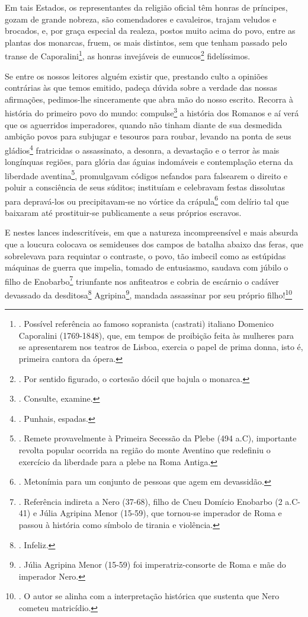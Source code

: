 Em tais Estados, os representantes da religião oficial têm honras de
príncipes, gozam de grande nobreza, são comendadores e cavaleiros,
trajam veludos e brocados, e, por graça especial da realeza, postos
muito acima do povo, entre as plantas dos monarcas, fruem, os mais
distintos, sem que tenham passado pelo transe de Caporalini\footnote{.
  Possível referência ao famoso sopranista (castrati) italiano Domenico
  Caporalini (1769-1848), que, em tempos de proibição feita às mulheres
  para se apresentarem nos teatros de Lisboa, exercia o papel de prima
  donna, isto é, primeira cantora da ópera.}, as honras invejáveis de
eunucos\footnote{. Por sentido figurado, o cortesão dócil que bajula o
  monarca.} fidelíssimos.

Se entre os nossos leitores alguém existir que, prestando culto a
opiniões contrárias às que temos emitido, padeça dúvida sobre a verdade
das nossas afirmações, pedimos-lhe sinceramente que abra mão do nosso
escrito. Recorra à história do primeiro povo do mundo:
compulse\footnote{. Consulte, examine.} a história dos Romanos e aí verá
que os aguerridos imperadores, quando não tinham diante de sua desmedida
ambição povos para subjugar e tesouros para roubar, levando na ponta de
seus gládios\footnote{. Punhais, espadas.} fratricidas o assassinato, a
desonra, a devastação e o terror às mais longínquas regiões, para glória
das águias indomáveis e contemplação eterna da liberdade
aventina\footnote{. Remete provavelmente à Primeira Secessão da Plebe
  (494 a.C), importante revolta popular ocorrida na região do monte
  Aventino que redefiniu o exercício da liberdade para a plebe na Roma
  Antiga.}, promulgavam códigos nefandos para falsearem o direito e
poluir a consciência de seus súditos; instituíam e celebravam festas
dissolutas para depravá-los ou precipitavam-se no vórtice da
crápula\footnote{. Metonímia para um conjunto de pessoas que agem em
  devassidão.} com delírio tal que baixaram até prostituir-se
publicamente a seus próprios escravos.

E nestes lances indescritíveis, em que a natureza incompreensível e mais
absurda que a loucura colocava os semideuses dos campos de batalha
abaixo das feras, que sobrelevava para requintar o contraste, o povo,
tão imbecil como as estúpidas máquinas de guerra que impelia, tomado de
entusiasmo, saudava com júbilo o filho de Enobarbo\footnote{. Referência
  indireta a Nero (37-68), filho de Cneu Domício Enobarbo (2 a.C-41) e
  Júlia Agripina Menor (15-59), que tornou-se imperador de Roma e passou
  à história como símbolo de tirania e violência.} triunfante nos
anfiteatros e cobria de escárnio o cadáver devassado da
desditosa\footnote{. Infeliz.} Agripina\footnote{. Júlia Agripina Menor
  (15-59) foi imperatriz-consorte de Roma e mãe do imperador Nero.},
mandada assassinar por seu próprio filho!\footnote{. O autor se alinha
  com a interpretação histórica que sustenta que Nero cometeu
  matricídio.}

